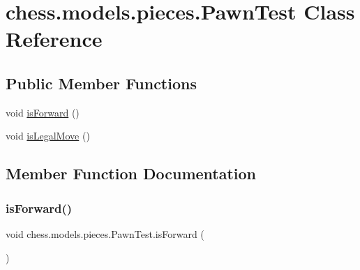\hypertarget{classchess_1_1models_1_1pieces_1_1_pawn_test}{}\section{chess.\+models.\+pieces.\+Pawn\+Test Class Reference}
\label{classchess_1_1models_1_1pieces_1_1_pawn_test}
\subsection*{Public Member Functions}
\begin{DoxyCompactItemize}
\item 
void \mbox{\hyperlink{classchess_1_1models_1_1pieces_1_1_pawn_test_afa43463ef4516891aa999190df961e1e}{is\+Forward}} ()
\item 
void \mbox{\hyperlink{classchess_1_1models_1_1pieces_1_1_pawn_test_a27e7deb43705ed5723795f0b9aa8ea9a}{is\+Legal\+Move}} ()
\end{DoxyCompactItemize}


\subsection{Member Function Documentation}
\mbox{\label{classchess_1_1models_1_1pieces_1_1_pawn_test_afa43463ef4516891aa999190df961e1e}} 
\subsubsection{\texorpdfstring{is\+Forward()}{isForward()}}
{\footnotesize\ttfamily void chess.\+models.\+pieces.\+Pawn\+Test.\+is\+Forward (\begin{DoxyParamCaption}{ }\end{DoxyParamCaption})}

\mbox{\label{classchess_1_1models_1_1pieces_1_1_pawn_test_a27e7deb43705ed5723795f0b9aa8ea9a}} 
